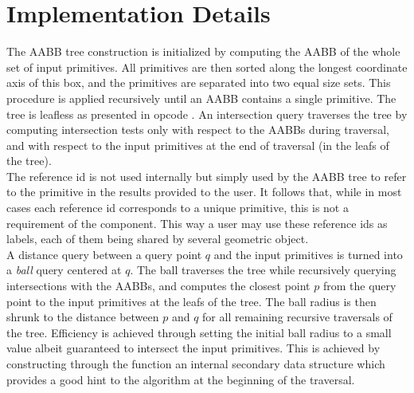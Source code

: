\section{Implementation Details}
\label{AABB_tree_section_details}

The AABB tree construction is initialized by computing the AABB of the whole set of input primitives. All primitives are then sorted along the longest coordinate axis of this box, and the primitives are separated into two equal size sets. This procedure is applied recursively until an AABB contains a single primitive. The tree is leafless as presented in {\sc opcode} \cite{cgal:t-ocdl-05}. An intersection query traverses the tree by computing intersection tests only with respect to the AABBs during traversal, and with respect to the input primitives at the end of traversal (in the leafs of the tree).\\

The reference id is not used internally but simply used by the AABB tree to refer to the primitive in the results provided to the user. It follows that, while in most cases each reference id corresponds to a unique primitive, this is not a requirement of the component. This way a user may use these reference ids as labels, each of them being shared by several geometric object. \\

A distance query between a query point $q$ and the input primitives is turned into a \emph{ball} query centered at $q$. The ball traverses the tree while recursively querying intersections with the AABBs, and computes the closest point $p$ from the query point to the input primitives at the leafs of the tree. The ball radius is then shrunk to the distance between $p$ and $q$ for all remaining recursive traversals of the tree. Efficiency is achieved through setting the initial ball radius to a small value albeit guaranteed to intersect the input primitives. This is achieved by constructing through the function  an internal secondary data structure which provides a good hint to the algorithm at the beginning of the traversal.


